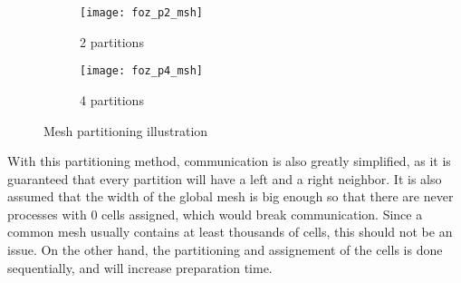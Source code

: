 \begin{figure}[!htp]
	\begin{subfigure}[b]{0.5\columnwidth}
		\centering
		\texttt{[image: foz\_p2\_msh]}
		\caption{2 partitions}
		\label{fig:foz_p2_msh}
	\end{subfigure}%
	\begin{subfigure}[b]{0.5\columnwidth}
		\centering
		\texttt{[image: foz\_p4\_msh]}
		\caption{4 partitions}
		\label{fig:foz_p4_msh}
	\end{subfigure}%

	\caption{Mesh partitioning illustration}
	\label{fig:partitioning}
\end{figure}



With this partitioning method, communication is also greatly simplified, as it is guaranteed that every partition will have a left and a right neighbor. It is also assumed that the width of the global mesh is big enough so that there are never processes with 0 cells assigned, which would break communication. Since a common mesh usually contains at least thousands of cells, this should not be an issue.
On the other hand, the partitioning and assignement of the cells is done sequentially, and will increase preparation time.
